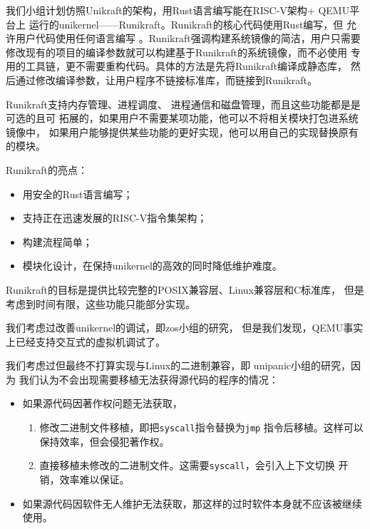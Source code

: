 \documentclass{../runikraft-report}
\begin{document}
我们小组计划仿照Unikraft的架构，用Rust语言编写能在RISC-V架构+ QEMU平台上
运行的unikernel——Runikraft。Runikraft的核心代码使用Rust编写，但
允许用户代码使用任何语言编写
。Runikraft强调构建系统镜像的简洁，用户只需要
修改现有的项目的编译参数就可以构建基于Runikraft的系统镜像，而不必使用
专用的工具链，更不需要重构代码。具体的方法是先将Runikraft编译成静态库，
然后通过修改编译参数，让用户程序不链接标准库，而链接到Runikraft。

Runikraft支持内存管理、进程调度、
进程通信和磁盘管理，而且这些功能都是是可选的且可
拓展的，如果用户不需要某项功能，他可以不将相关模块打包进系统镜像中，
如果用户能够提供某些功能的更好实现，他可以用自己的实现替换原有的模块。

Runikraft的亮点：
\begin{itemize}
\item 用安全的Rust语言编写；
\item 支持正在迅速发展的RISC-V指令集架构；
\item 构建流程简单；
\item 模块化设计，在保持unikernel的高效的同时降低维护难度。
\end{itemize}

Runikraft的目标是提供比较完整的POSIX兼容层、Linux兼容层和C标准库，
但是考虑到时间有限，这些功能只能部分实现。


我们考虑过改善unikernel的调试，即zos小组的研究，
但是我们发现，QEMU事实上已经支持交互式的虚拟机调试了。

我们考虑过但最终不打算实现与Linux的二进制兼容，即
unipanic小组的研究，因为
我们认为不会出现需要移植无法获得源代码的程序的情况：
\begin{itemize}
\item 如果源代码因著作权问题无法获取，
    \begin{enumerate}
    \item 修改二进制文件移植，即把\texttt{syscall}指令替换为\texttt{jmp}
    指令后移植。这样可以保持效率，但会侵犯著作权。
    \item 直接移植未修改的二进制文件。这需要\texttt{syscall}，会引入上下文切换
    开销，效率难以保证。
    \end{enumerate}
\item 如果源代码因软件无人维护无法获取，那这样的过时软件本身就不应该被继续使用。
\end{itemize}
\end{document}
